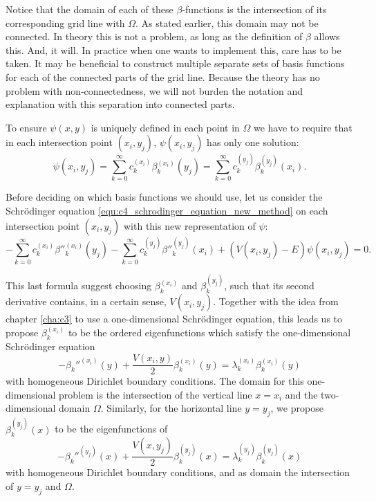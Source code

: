Notice that the domain of each of these $\beta$-functions is the intersection of its corresponding grid line with $\Omega$. As stated earlier, this domain may not be connected. In theory this is not a problem, as long as the definition of $\beta$ allows this. And, it will. In practice when one wants to implement this, care has to be taken. It may be beneficial to construct multiple separate sets of basis functions for each of the connected parts of the grid line. Because the theory has no problem with non-connectedness, we will not burden the notation and explanation with this separation into connected parts.

To ensure $\psi(x, y)$ is uniquely defined in each point in $\Omega$ we have to require that in each intersection point $(x_i, y_j)$, $\psi(x_i, y_j)$ has only one solution:
\begin{equation}\label{equ:c4_new_method_pre_matrix_equality}
    \psi(x_i, y_j) = \sum_{k=0}^\infty c_k^{(x_i)} \beta_k^{(x_i)}(y_j) = \sum_{k=0}^\infty c_k^{(y_j)} \beta_k^{(y_j)}(x_i)\text{.}
\end{equation}

Before deciding on which basis functions we should use, let us consider the Schrödinger equation \eqref{equ:c4_schrodinger_equation_new_method} on each intersection point $(x_i, y_j)$ with this new representation of $\psi$:
$$
    -\sum_{k=0}^\infty c_k^{(x_i)} \beta''^{(x_i)}_k(y_j) - \sum_{k=0}^\infty c_k^{(y_j)} \beta''^{(y_j)}_k(x_i) + (V(x_i, y_j) - E) \psi(x_i, y_j) = 0\text{.}
$$

This last formula suggest choosing $\beta_k^{(x_i)}$ and $\beta_k^{(y_j)}$, such that its second derivative contains, in a certain sense, $V(x_i, y_j)$. Together with the idea from chapter \ref{cha:c3} to use a one-dimensional Schrödinger equation, this leads us to propose $\beta_k^{(x_i)}$ to be the ordered eigenfunctions which satisfy the one-dimensional Schrödinger equation
$$
    -\beta_k''^{(x_i)}(y) + \frac{V(x_i, y)}{2}\beta_k^{(x_i)}(y) = \lambda_k^{(x_i)} \beta_k^{(x_i)}(y)
$$
with homogeneous Dirichlet boundary conditions. The domain for this one-dimensional problem is the intersection of the vertical line $x = x_i$ and the two-dimensional domain $\Omega$. Similarly, for the horizontal line $y = y_j$, we propose $\beta_k^{(y_j)}(x)$ to be the eigenfunctions of
$$
    -\beta_k''^{(y_j)}(x) + \frac{V(x, y_j)}{2}\beta_k^{(y_j)}(x) = \lambda_k^{(y_j)} \beta_k^{(y_j)}(x)
$$
with homogeneous Dirichlet boundary conditions, and as domain the intersection of $y = y_j$ and $\Omega$.

